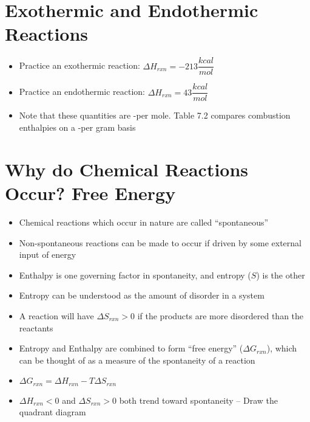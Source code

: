 \documentclass[12pt, openany, letterpaper]{memoir}
\begin{document}
\section{Exothermic and Endothermic Reactions}
\begin{itemize}
	\item Practice an exothermic reaction:  \hspace{1em} $\Delta H_{rxn}=-213\dfrac{kcal}{mol}$
	\item Practice an endothermic reaction:  \hspace{1em} $\Delta H_{rxn}=43\dfrac{kcal}{mol}$
	\item Note that these quantities are -per mole. Table 7.2 compares combustion enthalpies on a -per gram basis
\end{itemize}
\section{Why do Chemical Reactions Occur? Free Energy}
\begin{itemize}
	\item Chemical reactions which occur in nature are called ``spontaneous''
	\item Non-spontaneous reactions can be made to occur if driven by some external input of energy
	\item Enthalpy is one governing factor in spontaneity, and entropy ($S$) is the other
	\item Entropy can be understood as the amount of disorder in a system
	\item A reaction will have $\Delta S_{rxn}>0$ if the products are more disordered than the reactants
	\item Entropy and Enthalpy are combined to form ``free energy'' ($\Delta G_{rxn}$), which can be thought of as a measure of the spontaneity of a reaction
	\item $\Delta G_{rxn} = \Delta H_{rxn} - T\Delta S_{rxn}$
	\item $\Delta H_{rxn}<0$ and $\Delta S_{rxn}>0$ both trend toward spontaneity -- Draw the quadrant diagram
\end{itemize}
\end{document}
